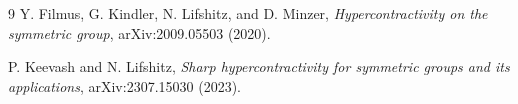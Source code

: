 \documentclass[11pt]{article}
\begin{document}
\begin{thebibliography}{9}
Y. Filmus, G. Kindler, N. Lifshitz, and D. Minzer,
\emph{Hypercontractivity on the symmetric group},
arXiv:2009.05503 (2020).

P. Keevash and N. Lifshitz,
\emph{Sharp hypercontractivity for symmetric groups and its applications},
arXiv:2307.15030 (2023).
\end{thebibliography}
\end{document}
